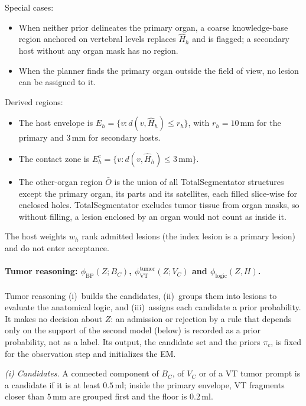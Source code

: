 \documentclass[fleqn,10pt]{olplainarticle}
\begin{document}
Special cases:
\begin{itemize}
\item When neither prior delineates the primary organ, a coarse knowledge-base region anchored on vertebral levels replaces
$\hat H_h$ and is flagged; a secondary host without any organ mask has no region.
\item When the planner finds the primary organ outside the field of view, no lesion can be assigned to it.
\end{itemize}

Derived regions:
\begin{itemize}
\item The host envelope is $E_h=\{v: d(v,\hat H_h)\le r_h\}$, with $r_h=10$\,mm for the primary and $3$\,mm for secondary hosts.
\item The contact zone is $E^{c}_h=\{v: d(v,\hat H_h)\le3\,\mathrm{mm}\}$.
\item The other-organ region $\bar O$ is the union of all TotalSegmentator structures except the primary organ, its parts and
its satellites, each filled slice-wise for enclosed holes. TotalSegmentator excludes tumor tissue from organ masks, so
without filling, a lesion enclosed by an organ would not count as inside it.
\end{itemize}

The host weights $w_h$ rank admitted lesions (the index lesion is a primary lesion) and do not enter acceptance.

\paragraph{Tumor reasoning: $\phi_{\mathrm{BP}}(Z;B_C)$, $\phi^{\mathrm{tumor}}_{\mathrm{VT}}(Z;V_C)$ and
$\phi_{\mathrm{logic}}(Z,H)$.}
Tumor reasoning (i)~builds the candidates, (ii)~groups them into lesions to evaluate the anatomical logic, and
(iii)~assigns each candidate a prior probability. It makes no decision about $Z$: an admission or rejection by a rule that
depends only on the support of the second model (below) is recorded as a prior probability, not as a label. Its output,
the candidate set and the priors $\pi_c$, is fixed for the observation step and initializes the EM.

\textit{(i) Candidates.} A connected component of $B_C$, of $V_C$ or of a VT tumor prompt is a candidate if it is at least
$0.5$\,ml; inside the primary envelope, VT fragments closer than $5$\,mm are grouped first and the floor is $0.2$\,ml.
\end{document}
